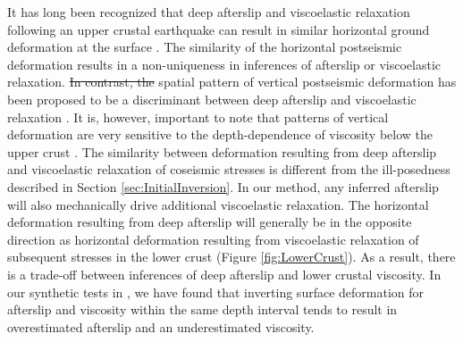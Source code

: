 \documentclass[draft,linenumbers]{AGUJournal}
\providecommand{\DIFadd}[1]{{\protect\color{blue}\uwave{#1}}} %
\providecommand{\DIFdel}[1]{{\protect\color{red}\sout{#1}}}                      %
\providecommand{\DIFaddbegin}{} %
\providecommand{\DIFaddend}{} %
\providecommand{\DIFdelbegin}{} %
\providecommand{\DIFdelend}{} %
\begin{document}
\DIFdelend It has long been recognized that deep afterslip and viscoelastic relaxation following an upper crustal earthquake can result in similar horizontal ground deformation at the surface \citep[e.g.][]{Savage1990, Pollitz2001, Hearn2003, Feigl2006}. The similarity of the horizontal postseismic deformation results in a non-uniqueness in inferences of afterslip or viscoelastic relaxation.  \DIFdelbegin \DIFdel{In contrast, the }\DIFdelend \DIFaddbegin \DIFadd{The }\DIFaddend spatial pattern of vertical postseismic deformation has been proposed to be a discriminant between deep afterslip and viscoelastic relaxation \citep[e.g.][]{Pollitz2001, Hearn2003}. It is, however, important to note that patterns of vertical deformation are very sensitive to the depth-dependence of viscosity below the upper crust \citep{Yang1981,Hetland2014}.  The similarity between deformation resulting from deep afterslip and viscoelastic relaxation of coseismic stresses is different from the ill-posedness described in Section \ref{sec:InitialInversion}. In our method, any inferred afterslip will also mechanically drive additional viscoelastic relaxation.  The horizontal deformation resulting from deep afterslip will generally be in the opposite direction as horizontal deformation resulting from viscoelastic relaxation of subsequent stresses in the lower crust (Figure \ref{fig:LowerCrust}).  As a result, there is a trade-off between inferences of deep afterslip and lower crustal viscosity.  In our synthetic tests in \citet{Hines2016}, we have found that inverting surface deformation for afterslip and viscosity within the same depth interval tends to result in overestimated afterslip and an underestimated viscosity.
\end{document}
